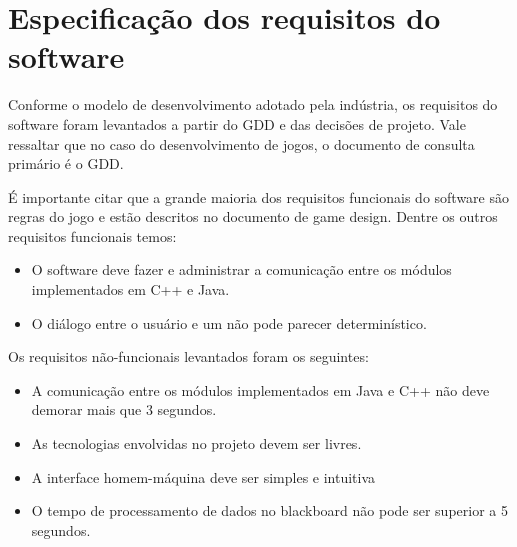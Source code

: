 \section{Especificação dos requisitos do software}
Conforme o modelo de desenvolvimento adotado pela indústria, os requisitos do software foram levantados a partir do GDD e das decisões de projeto. Vale ressaltar que no caso do desenvolvimento de jogos, o documento de consulta primário é o GDD.

É importante citar que a grande maioria dos requisitos funcionais do software são regras do jogo e estão descritos no documento de game design. Dentre os outros requisitos funcionais temos:
\begin{itemize}
\item O software deve fazer e administrar a comunicação entre os módulos implementados em C++ e Java.
\item O diálogo entre o usuário e um \npc{} não pode parecer determinístico.
\end{itemize}

Os requisitos não-funcionais levantados foram os seguintes:
\begin{itemize}
\item A comunicação entre os módulos implementados em Java e C++ não deve demorar mais que 3 segundos.
\item As tecnologias envolvidas no projeto devem ser livres.
\item A interface homem-máquina deve ser simples e intuitiva
\item O tempo de processamento de dados no blackboard não pode ser superior a 5 segundos.
\end{itemize}
